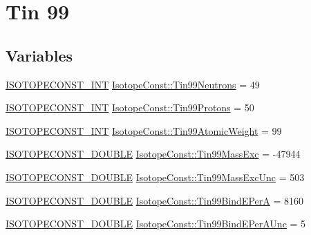 \hypertarget{group___isotope_const-_tin-_sn99}{}\section{Tin 99}
\label{group___isotope_const-_tin-_sn99}
\subsection*{Variables}
\begin{DoxyCompactItemize}
\item 
\mbox{\hyperlink{group___isotope_const-_macros_ga5f18360b3e99483a35c32d789e62621c}{I\+S\+O\+T\+O\+P\+E\+C\+O\+N\+S\+T\+\_\+\+I\+NT}} \mbox{\hyperlink{group___isotope_const-_tin-_sn99_ga939f630df23ae8f1b0af3985431ed4bb}{Isotope\+Const\+::\+Tin99\+Neutrons}} = 49
\item 
\mbox{\hyperlink{group___isotope_const-_macros_ga5f18360b3e99483a35c32d789e62621c}{I\+S\+O\+T\+O\+P\+E\+C\+O\+N\+S\+T\+\_\+\+I\+NT}} \mbox{\hyperlink{group___isotope_const-_tin-_sn99_gadca318d838d5670e2ec63616dd6472b1}{Isotope\+Const\+::\+Tin99\+Protons}} = 50
\item 
\mbox{\hyperlink{group___isotope_const-_macros_ga5f18360b3e99483a35c32d789e62621c}{I\+S\+O\+T\+O\+P\+E\+C\+O\+N\+S\+T\+\_\+\+I\+NT}} \mbox{\hyperlink{group___isotope_const-_tin-_sn99_gab233481171dcf70360b0de13548ae40a}{Isotope\+Const\+::\+Tin99\+Atomic\+Weight}} = 99
\item 
\mbox{\hyperlink{group___isotope_const-_macros_ga8f45a7272ce02c0b4c65c44636ed719a}{I\+S\+O\+T\+O\+P\+E\+C\+O\+N\+S\+T\+\_\+\+D\+O\+U\+B\+LE}} \mbox{\hyperlink{group___isotope_const-_tin-_sn99_ga85327bd2c5f698e1a70b7b5466433d4e}{Isotope\+Const\+::\+Tin99\+Mass\+Exc}} = -\/47944
\item 
\mbox{\hyperlink{group___isotope_const-_macros_ga8f45a7272ce02c0b4c65c44636ed719a}{I\+S\+O\+T\+O\+P\+E\+C\+O\+N\+S\+T\+\_\+\+D\+O\+U\+B\+LE}} \mbox{\hyperlink{group___isotope_const-_tin-_sn99_ga21157eb8e99ecff4737350f8e7aa21f0}{Isotope\+Const\+::\+Tin99\+Mass\+Exc\+Unc}} = 503
\item 
\mbox{\hyperlink{group___isotope_const-_macros_ga8f45a7272ce02c0b4c65c44636ed719a}{I\+S\+O\+T\+O\+P\+E\+C\+O\+N\+S\+T\+\_\+\+D\+O\+U\+B\+LE}} \mbox{\hyperlink{group___isotope_const-_tin-_sn99_ga97c6e4edfff89acd4d81f8512b4ede93}{Isotope\+Const\+::\+Tin99\+Bind\+E\+PerA}} = 8160
\item 
\mbox{\hyperlink{group___isotope_const-_macros_ga8f45a7272ce02c0b4c65c44636ed719a}{I\+S\+O\+T\+O\+P\+E\+C\+O\+N\+S\+T\+\_\+\+D\+O\+U\+B\+LE}} \mbox{\hyperlink{group___isotope_const-_tin-_sn99_ga88298edfb09bffc7bda1c833206625d2}{Isotope\+Const\+::\+Tin99\+Bind\+E\+Per\+A\+Unc}} = 5

\end{DoxyCompactItemize}
